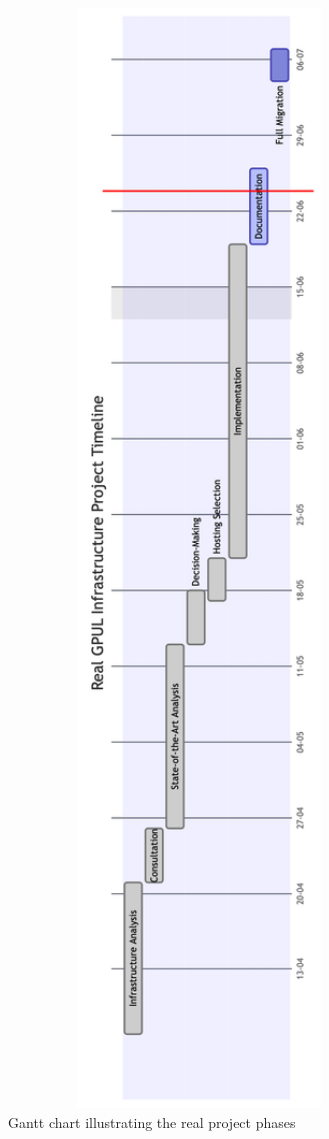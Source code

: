 \begin{figure}[H]
  \centering
  \includegraphics[width=0.9\textwidth]{imaxes/gantt-real.png}
  \caption{Gantt chart illustrating the real project phases}
  \label{fig:gantt-real}
\end{figure}

